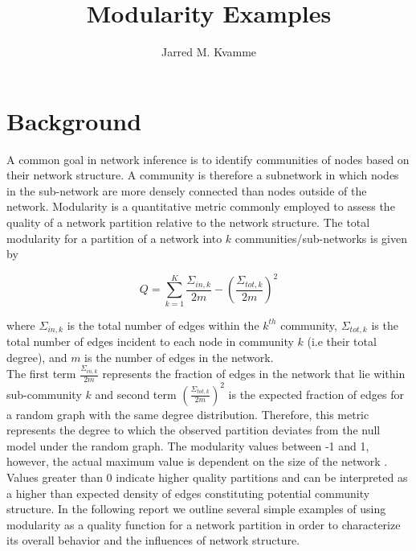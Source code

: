 \documentclass[a4paper,12pt]{article}
\begin{document}
	\begin{titlepage}
		\title{Modularity Examples}
		\author[1]{Jarred M. Kvamme}
		\maketitle
	\end{titlepage}
	
	
	\newpage
	\tableofcontents
	\listoftables
	\listoffigures
	\newpage
	
	\section{Background}
	A common goal in network inference is to identify communities of nodes based on their network structure. A community is therefore a subnetwork in which nodes in the sub-network are more densely connected than nodes outside of the network. Modularity is a quantitative metric commonly employed \cite{} to assess the quality of a network partition relative to the network structure. The total modularity for a partition of a network into $k$ communities/sub-networks is given by
	
	\[Q = \sum_{k=1}^K\frac{\Sigma_{in,k}}{2m} - \left(\frac{\Sigma_{tot,k}}{2m}\right)^2 \]
	
	\noindent where $\Sigma_{in,k}$ is the total number of edges within the $k^{th}$ community, $\Sigma_{tot,k}$ is the total number of edges incident to each node in community $k$ (i.e their total degree), and $m$ is the number of edges in the network. 
	\\
	
	The first term $\frac{\Sigma_{in,k}}{2m}$ represents the fraction of edges in the network that lie within sub-community $k$ and second term $\left(\frac{\Sigma_{tot,k}}{2m}\right)^2$ is the expected fraction of edges for a random graph with the same degree distribution. Therefore, this metric represents the degree to which the observed partition deviates from the null model under the random graph. The modularity values between -1 and 1, however, the actual maximum value is dependent on the size of the network \cite{}. Values greater than 0 indicate higher quality partitions and can be interpreted as a higher than expected density of edges constituting potential community structure. In the following report we outline several simple examples of using modularity as a quality function for a network partition in order to characterize its overall behavior and the influences of network structure. 
	
\end{document}
